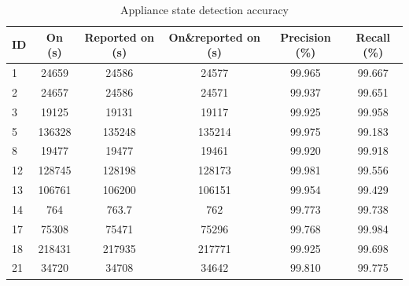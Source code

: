 \begin{table}
  \centering
  \begin{tabular}{lccccc}
  \hline
  ID & On (s) & Reported on (s) & On\&reported on (s) & Precision (\%) & Recall (\%) \\
  \hline
﻿1  & 24659  & 24586  & 24577   &99.965 &99.667 \\
2  & 24657  & 24586  & 24571   &99.937 &99.651 \\
3  & 19125  & 19131  & 19117   &99.925 &99.958 \\
5  & 136328 & 135248 & 135214  &99.975 &99.183 \\
8  & 19477  & 19477  & 19461   &99.920 &99.918 \\
12 & 128745 & 128198 & 128173  &99.981 &99.556 \\
13 & 106761 & 106200 & 106151  &99.954 &99.429 \\
14 & 764    & 763.7  & 762     &99.773 &99.738 \\
17 & 75308  & 75471  & 75296   &99.768 &99.984 \\
18 & 218431 & 217935 & 217771  &99.925 &99.698 \\
21 & 34720  & 34708  & 34642   &99.810 &99.775 \\
  \hline
  \end{tabular}
  \caption{Appliance state detection accuracy}
  \label{tab:pre-recall}
\end{table}


